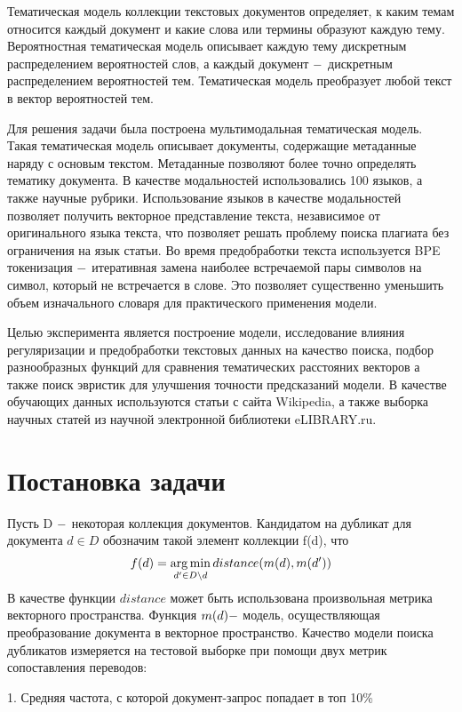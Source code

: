 \documentclass[12pt, twoside]{article}
\begin{document}
Тематическая модель коллекции текстовых документов определяет, к каким темам относится каждый документ и какие слова или термины образуют каждую тему. Вероятностная тематическая модель описывает каждую тему дискретным распределением вероятностей слов, а каждый документ $\--$ дискретным распределением вероятностей тем. Тематическая модель преобразует любой текст в вектор вероятностей тем. 

Для решения задачи была построена мультимодальная тематическая модель. Такая тематическая модель описывает документы, содержащие метаданные наряду с основым текстом. Метаданные позволяют более точно определять тематику документа. В качестве модальностей использовались 100 языков, а также научные рубрики. Использование языков в качестве модальностей позволяет получить векторное представление текста, независимое от оригинального языка текста, что позволяет решать проблему поиска плагиата без ограничения на язык статьи. Во время предобработки текста используется BPE токенизация $\--$ итеративная замена наиболее встречаемой пары символов на символ, который не встречается в слове. Это позволяет существенно уменьшить объем изначального словаря для практического применения модели.

Целью эксперимента является построение модели, исследование влияния регуляризации и предобработки текстовых данных на качество поиска, подбор разнообразных функций для сравнения тематических расстояних векторов а также поиск эвристик для улучшения точности предсказаний модели. В качестве обучающих данных используются статьи с сайта Wikipedia, а также выборка научных статей из научной электронной библиотеки eLIBRARY.ru.

\section{Постановка задачи}

Пусть D $\--$ некоторая коллекция документов. Кандидатом на дубликат  для документа $d \in D$ обозначим такой элемент коллекции f(d), что  $$f(d) = \argmin_{d' \in D \setminus d} distance(m(d), m(d'))$$ 
В качестве функции $distance$ может быть использована произвольная метрика векторного пространства. Функция  $m(d) \--$ модель, осуществляющая преобразование документа в векторное пространство. Качество модели поиска дубликатов измеряется на тестовой выборке при помощи двух метрик сопоставления переводов:

1. Средняя частота, с которой документ-запрос попадает в топ 10\%
\end{document}
